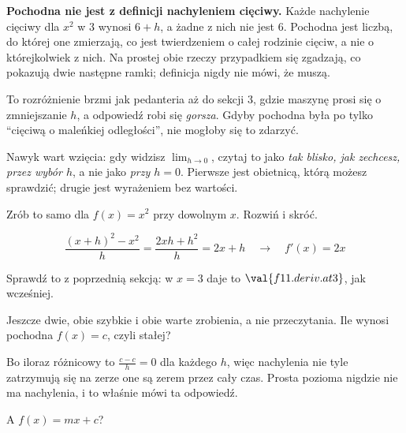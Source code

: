 \begin{fr}
\begin{trapbox}
\textbf{Pochodna nie jest z definicji nachyleniem cięciwy.} Każde nachylenie
cięciwy dla $x^{2}$ w $3$ wynosi $6 + h$, a żadne z nich nie jest $6$.
Pochodna jest liczbą, do której one zmierzają, co jest twierdzeniem o całej
rodzinie cięciw, a nie o którejkolwiek z nich. Na prostej obie rzeczy
przypadkiem się zgadzają, co pokazują dwie następne ramki; definicja nigdy nie
mówi, że muszą.

To rozróżnienie brzmi jak pedanteria aż do sekcji 3, gdzie maszynę prosi się o
zmniejszanie $h$, a odpowiedź robi się \emph{gorsza}. Gdyby pochodna była po
tylko \enquote{cięciwą o maleńkiej odległości}, nie mogłoby się to zdarzyć.

Nawyk wart wzięcia: gdy widzisz $\lim_{h \to 0}$, czytaj to jako \emph{tak
blisko, jak zechcesz, przez wybór $h$}, a nie jako \emph{przy $h = 0$}.
Pierwsze jest obietnicą, którą możesz sprawdzić; drugie jest wyrażeniem bez
wartości.
\end{trapbox}

Zrób to samo dla $f(x) = x^{2}$ przy dowolnym $x$. Rozwiń i skróć.
\nextframe
\end{fr}

\begin{fr}
\begin{ansblock}
\[ \frac{(x+h)^{2} - x^{2}}{h} = \frac{2xh + h^{2}}{h} = 2x + h
   \quad\longrightarrow\quad f'(x) = 2x \]
\end{ansblock}

Sprawdź to z poprzednią sekcją: w $x = 3$ daje to $\val{f11.deriv.at3}$, jak
wcześniej.

Jeszcze dwie, obie szybkie i obie warte zrobienia, a nie przeczytania. Ile
wynosi pochodna $f(x) = c$, czyli stałej?
\nextframe
\end{fr}

\begin{fr}
Bo iloraz różnicowy to $\frac{c - c}{h} = 0$ dla każdego $h$, więc nachylenia
nie tyle zatrzymują się na zerze \dash{} one są zerem przez cały czas. Prosta
pozioma nigdzie nie ma nachylenia, i to właśnie mówi ta odpowiedź.

A $f(x) = mx + c$?
\nextframe
\end{fr}

